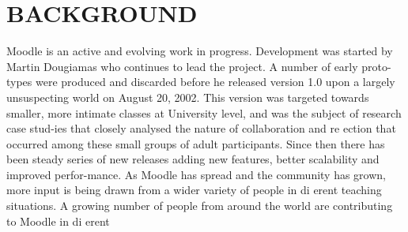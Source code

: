 \documentclass[12pt,a4paper,final,oneside]{report}
\begin{document}
\section{BACKGROUND}
Moodle is an active and evolving work in progress. Development was started by Martin Dougiamas who continues to lead the project. A number of early proto-types were produced and discarded before he released version 1.0 upon a largely unsuspecting world on August 20, 2002. This version was targeted towards smaller, more intimate classes at University level, and was the subject of research case stud-ies that closely analysed the nature of collaboration and re ection that occurred among these small groups of adult participants. Since then there has been steady series of new releases adding new features, better scalability and improved perfor-mance. As Moodle has spread and the community has grown, more input is being drawn from a wider variety of people in di erent teaching situations. A growing number of people from around the world are contributing to Moodle in di erent 
\end{document}
